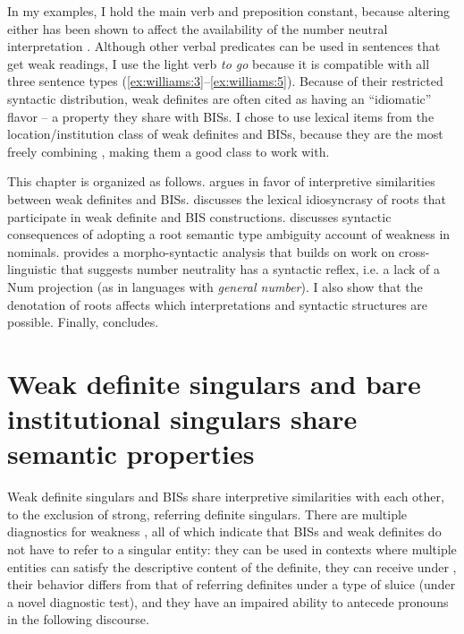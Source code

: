 \documentclass[output=paper,
modfonts
]{langscibook}
\begin{document}
In my examples, I hold the main verb and preposition constant, because altering either has been shown to affect the availability of the number neutral interpretation \citep[18--19]{Aguilar-Guevara2014}. Although other verbal predicates can be used in sentences that get weak readings, I use the light verb \textit{to go} because it is compatible with all three sentence types (\ref{ex:williams:3}--\ref{ex:williams:5}). Because of their restricted syntactic distribution, weak definites are often cited as having an ``idiomatic'' flavor \citep{NunbergEtAlii1994} -- a property they share with BISs. I chose to use lexical items from the location/institution class of weak definites \citep{stvan1998} and BISs, because they are the most freely combining \citep{BaldwinEtAlii2006}, making them a good class to work with.  

This chapter is organized as follows.  argues in favor of interpretive similarities between weak definites and BISs.  discusses the lexical idiosyncrasy of roots that participate in weak definite and BIS constructions.  discusses syntactic consequences of adopting a root semantic type ambiguity account of weakness in  nominals.  provides a morpho-syntactic analysis that builds on work on cross-linguistic  that suggests number neutrality has a syntactic reflex, i.e. a lack of a Num projection (as in languages with \textit{general number}). I also show that the denotation of roots affects which interpretations and syntactic structures are possible. Finally,  concludes.

\section{Weak definite singulars and bare institutional singulars share semantic properties}\label{sec:williams:2}

Weak definite singulars and BISs share interpretive similarities with each other, to the exclusion of strong, referring definite singulars. There are multiple diagnostics for weakness \citep[see][]{CarlsonSussman2005}, all of which indicate that BISs and weak definites do not have to refer to a singular entity: they can be used in contexts where multiple entities can satisfy the descriptive content of the definite, they can receive  under , their behavior differs from that of referring definites under a type of sluice (under a novel diagnostic test), and they have an impaired ability to antecede pronouns in the following discourse. 
\end{document}
